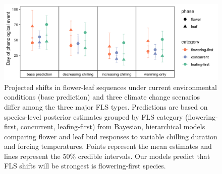 \documentclass[11pt]{article}\usepackage[]{graphicx}\usepackage[]{color}
\begin{document}
\pagebreak

\begin{figure}[h!]
    \centering
 \includegraphics[width=\textwidth]{..//Plots/Flobuds_manuscript_figs/posteriorgroups_go.png}
    \caption{Projected shifts in flower-leaf sequences under current environmental conditions (base prediction) and three climate change scenarios differ among the three major FLS types. Predictions are based on species-level posterior estimates grouped by FLS category (flowering-first, concurrent, leafing-first) from Bayesian, hierarchical models comparing flower and leaf bud responses to variable chilling duration and forcing temperatures. Points represent the mean estimates and lines represent the 50\% credible intervals. Our models predict that FLS shifts will be strongest is flowering-first species.}
    \label{fig:preddy}
\end{figure}
\end{document}
